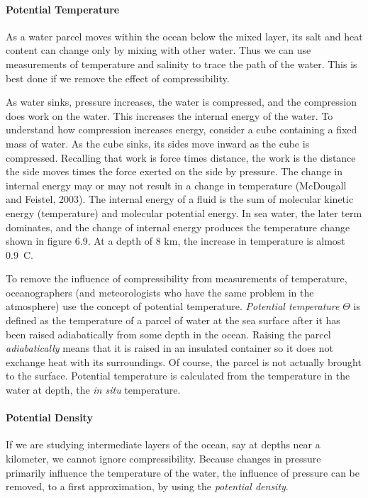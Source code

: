 \paragraph{Potential Temperature}
As a water parcel moves within the ocean below the mixed layer, its salt and heat content can change only by mixing with other water. Thus we can use measurements of temperature and salinity to trace the path of the water. This is best done if we remove the effect of compressibility.

As water sinks, pressure increases, the water is compressed, and the compression does work on the water. This increases the internal energy of the water. To understand how compression increases energy, consider a cube containing a fixed mass of water. As the cube sinks, its sides move inward as the cube is compressed. Recalling that work is force times distance, the work is the distance the side moves times the force exerted on the side by pressure. The change in internal energy may or may not result in a change in temperature (McDougall and Feistel, 2003). The internal energy of a fluid is the sum of molecular kinetic energy (temperature) and molecular potential energy. In sea water, the later term dominates, and the change of internal energy produces the temperature change shown in figure 6.9. At a depth of 8 km, the increase in temperature is almost 0.9\degrees\ C.

To remove the influence of compressibility from measurements of temperature, oceanographers (and meteorologists who have the same problem in the atmosphere) use the concept of potential temperature. \textit{Potential temperature} $\Theta$ is defined as the temperature of a parcel of water at the sea surface after it has been raised adiabatically from some depth in the ocean. Raising the parcel \textit{adiabatically} means that it is raised in an insulated container so it does not exchange heat with its surroundings. Of course, the parcel is not actually brought to the surface. Potential temperature is calculated from the temperature in the water at depth, the \textit{in situ} temperature.

\paragraph{Potential Density}
If we are studying intermediate layers of the ocean, say at depths near a kilometer, we cannot ignore compressibility. Because changes in pressure primarily influence the temperature of the water, the influence of pressure can be removed, to a first approximation, by using the \textit{potential density}.

